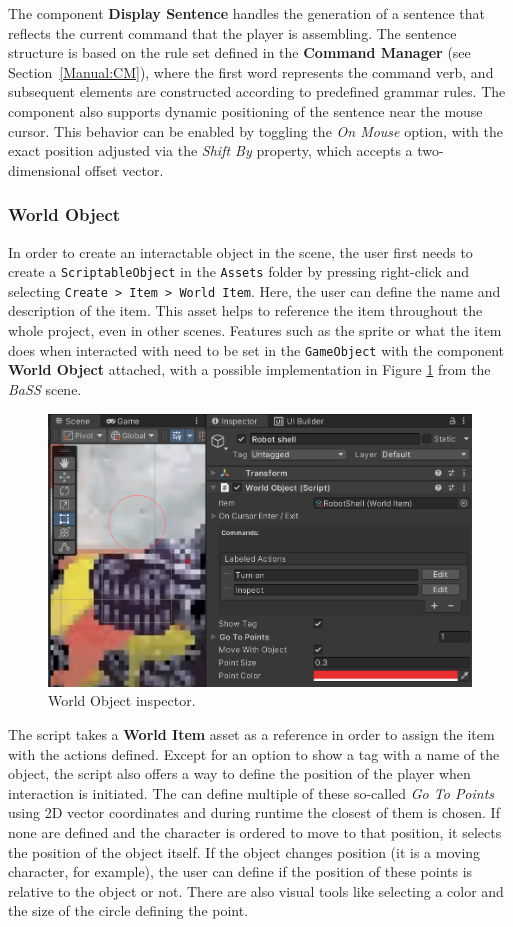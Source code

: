 The component \textbf{Display Sentence} handles the generation of a sentence that reflects the current command that the player is assembling. The sentence structure is based on the rule set defined in the \textbf{Command Manager} (see Section~\ref{Manual:CM}), where the first word represents the command verb, and subsequent elements are constructed according to predefined grammar rules. The component also supports dynamic positioning of the sentence near the mouse cursor. This behavior can be enabled by toggling the \textit{On Mouse} option, with the exact position adjusted via the \textit{Shift By} property, which accepts a two-dimensional offset vector.

\subsubsection{World Object}
\label{Manual:WO}
In order to create an interactable object in the scene, the user first needs to create a \verb|ScriptableObject| in the \verb|Assets| folder by pressing right-click and selecting \verb|Create > Item > World Item|. Here, the user can define the name and description of the item. This asset helps to reference the item throughout the whole project, even in other scenes. Features such as the sprite or what the item does when interacted with need to be set in the \verb|GameObject| with the component \textbf{World Object} attached, with a possible implementation in Figure \ref{fig:Manual-WO} from the \textit{BaSS} scene. 

\begin{figure}[H]
\centering
\includegraphics[width=.8\linewidth]{img/User doc/world_object.png}
\caption{World Object inspector.}
\label{fig:Manual-WO}
\end{figure}

The script takes a \textbf{World Item} asset as a reference in order to assign the item with the actions defined. Except for an option to show a tag with a name of the object, the script also offers a way to define the position of the player when interaction is initiated. The can define multiple of these so-called \textit{Go To Points} using 2D vector coordinates and during runtime the closest of them is chosen. If none are defined and the character is ordered to move to that position, it selects the position of the object itself. If the object changes position (it is a moving character, for example), the user can define if the position of these points is relative to the object or not. There are also visual tools like selecting a color and the size of the circle defining the point.

